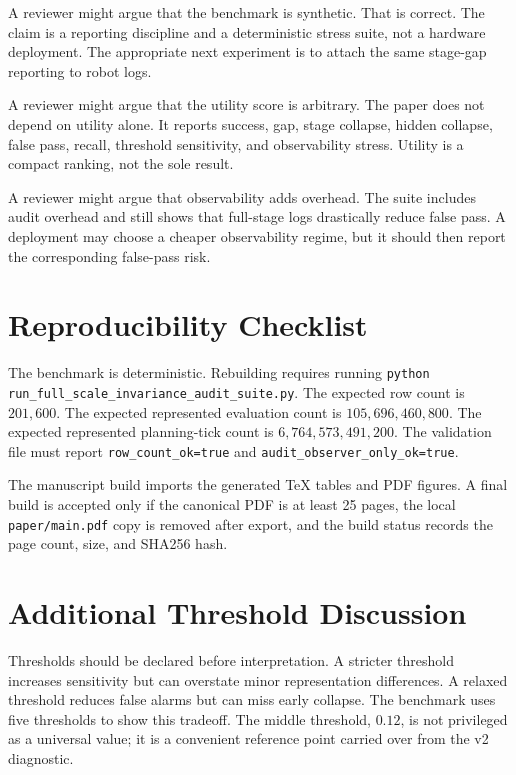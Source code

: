 \documentclass{article}
\begin{document}
A reviewer might argue that the benchmark is synthetic. That is correct. The claim is a reporting discipline and a deterministic stress suite, not a hardware deployment. The appropriate next experiment is to attach the same stage-gap reporting to robot logs.

A reviewer might argue that the utility score is arbitrary. The paper does not depend on utility alone. It reports success, gap, stage collapse, hidden collapse, false pass, recall, threshold sensitivity, and observability stress. Utility is a compact ranking, not the sole result.

A reviewer might argue that observability adds overhead. The suite includes audit overhead and still shows that full-stage logs drastically reduce false pass. A deployment may choose a cheaper observability regime, but it should then report the corresponding false-pass risk.

\section{Reproducibility Checklist}

The benchmark is deterministic. Rebuilding requires running \texttt{python run\_full\_scale\_invariance\_audit\_suite.py}. The expected row count is $201{,}600$. The expected represented evaluation count is $105{,}696{,}460{,}800$. The expected represented planning-tick count is $6{,}764{,}573{,}491{,}200$. The validation file must report \texttt{row\_count\_ok=true} and \texttt{audit\_observer\_only\_ok=true}.

The manuscript build imports the generated TeX tables and PDF figures. A final build is accepted only if the canonical PDF is at least 25 pages, the local \texttt{paper/main.pdf} copy is removed after export, and the build status records the page count, size, and SHA256 hash.

\section{Additional Threshold Discussion}

Thresholds should be declared before interpretation. A stricter threshold increases sensitivity but can overstate minor representation differences. A relaxed threshold reduces false alarms but can miss early collapse. The benchmark uses five thresholds to show this tradeoff. The middle threshold, $0.12$, is not privileged as a universal value; it is a convenient reference point carried over from the v2 diagnostic.
\end{document}
